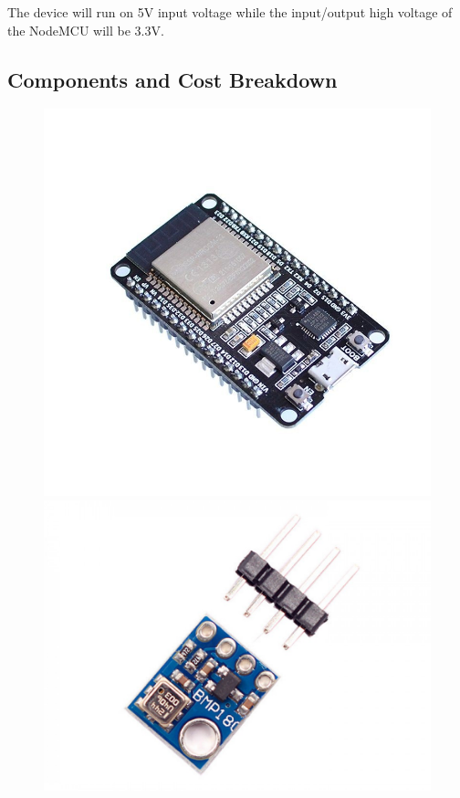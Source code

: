 \documentclass[12pt,a4paper]{article}
\begin{document}
\noindent The device will run on 5V input voltage while the input/output high
voltage of the NodeMCU will be 3.3V.

\clearpage

\newpage


\subsection{Components and Cost Breakdown}


\begin{figure}[!htb]
    \centering
    \includegraphics[width=0.9\linewidth]{./images/nodemcu.jpg}
    \endminipage\hfill
    \centering
    \includegraphics[width=0.9\linewidth]{./images/bmp180.jpeg}

\end{figure}
\end{document}
